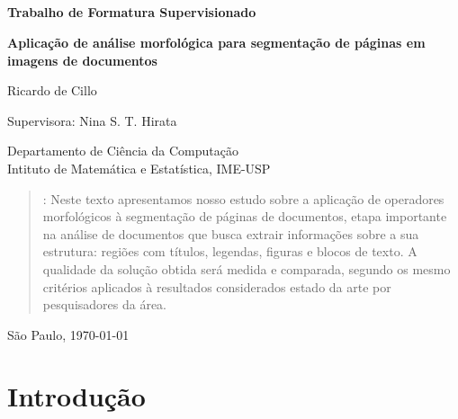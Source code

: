 \documentclass[a4paper,11pt]{article}
\begin{document}


\thispagestyle{empty}
\

\

\

\

\begin{center}
{\bf \Large Trabalho de Formatura Supervisionado}

\bigskip
\bigskip
{\bf \LARGE Aplicação de análise morfológica para segmentação de páginas em imagens de documentos}

\bigskip
{\large Ricardo de Cillo}

\bigskip
Supervisora: Nina S. T. Hirata 

\bigskip
Departamento de Ciência da Computação\\
Intituto de Matemática e Estatística, IME-USP
\end{center}


\bigskip
\begin{quote}
\begin{spacing}{1.2}
: Neste texto apresentamos nosso estudo sobre a aplicação de operadores morfológicos à segmentação de páginas de documentos, etapa importante na análise de documentos que busca extrair informações sobre a sua estrutura: regiões com títulos, legendas, figuras e blocos de texto. A qualidade da solução obtida será medida e comparada, segundo os mesmo critérios aplicados à resultados considerados estado da arte por pesquisadores da área.
\end{spacing} 
\end{quote}

\bigskip
\begin{center}
São Paulo, \today
\end{center}


\newpage

\tableofcontents

\newpage
\setcounter{page}{1}

\section{Introdução}
\end{document}
